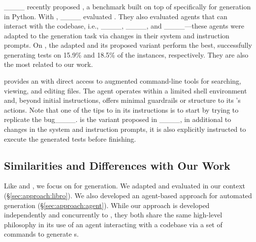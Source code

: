 \subsubsection{\sweagentplus}
\label{sec:relatedwork:brt:swtbench}

____ recently proposed \swtbench, a benchmark built on top of \swebench specifically for \brt generation in Python.
With \swtbench, ____ evaluated \libro. 
They also evaluated \autopr agents that can interact with the codebase, i.e., \aider____, \autocoderover____, and \sweagent____---these agents were adapted to the \brt generation task via changes in their system and instruction prompts.
On \swtbench, the adapted \sweagent and its proposed variant \sweagentplus perform the best, successfully generating \failtopass tests on 15.9\% and 18.5\% of the instances, respectively. 
They are also the most related to our work.


\sweagent provides an \llm with direct access to augmented command-line tools for searching, viewing, and editing files. 
The agent operates within a limited shell environment and, beyond initial instructions, offers minimal guardrails or structure to its \llm's actions.
Note that one of the tips to \sweagent in its instructions is to start by trying to replicate the bug____.
\sweagentplus is the \sweagent variant proposed in ____, in additional to changes in the system and instruction prompts, it is also explicitly instructed to execute the generated tests before finishing.

\subsection{Similarities and Differences with Our Work}
\label{sec:relatedwork:compare}

Like \libro and \swtbench, we focus on \llm for \brt generation.
We adapted and evaluated \libro in our context (\S\ref{sec:approach:libro}).
We also developed an  agent-based approach for automated \brt generation (\S\ref{sec:approach:agent}).
While our approach is developed independently and concurrently to \sweagentplus, they both share the same high-level philosophy in its use of an \llm agent interacting with a codebase via a set of commands to generate \brt{}s.

